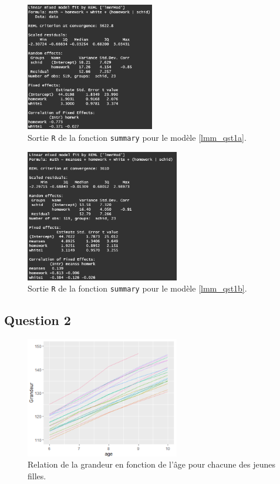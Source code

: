 \documentclass{article}
\begin{document}
\begin{figure}[H]  %
	\centering
	\includegraphics[width=0.5\textwidth]{graphiques/summary_Qst1a}
	\caption{Sortie \texttt{R} de la fonction \texttt{summary} pour le modèle \eqref{lmm_qst1a}.}
	\label{summary_Qst1a}
\end{figure}

\begin{figure}[H]  %
	\centering
	\includegraphics[width=0.6\textwidth]{graphiques/summary_Qst1b}
	\caption{Sortie \texttt{R} de la fonction \texttt{summary} pour le modèle \eqref{lmm_qst1b}.}
	\label{summary_Qst1b}
\end{figure}


\subsection{Question 2}

\begin{figure}[H]  %
	\centering
	\includegraphics[width=0.6\textwidth]{graphiques/Grandeur_VS_age_Qst2}
	\caption{Relation de la grandeur en fonction de l'âge pour chacune des jeunes filles.}
	\label{Grandeur_VS_age_Qst2}
\end{figure}
	
\end{document}
